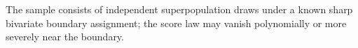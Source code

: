The sample consists of independent superpopulation draws under a known sharp bivariate boundary assignment; the score law may vanish polynomially or more severely near the boundary.